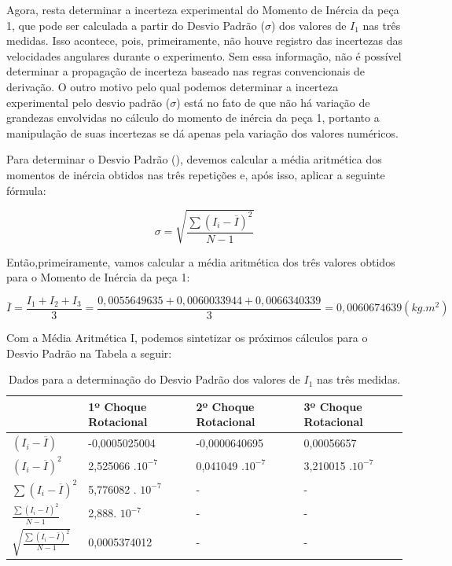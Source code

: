 Agora, resta determinar a incerteza experimental do Momento de Inércia da peça 1, que pode ser calculada a partir do Desvio Padrão ($\sigma$) dos valores de $I_1$ nas três medidas. Isso acontece, pois, primeiramente, não houve registro das incertezas das velocidades angulares durante o experimento. Sem essa informação, não é possível determinar a propagação de incerteza baseado nas regras convencionais de derivação. O outro motivo pelo qual podemos determinar a incerteza experimental pelo desvio padrão ($\sigma$) está no fato de que não há variação de grandezas envolvidas no cálculo do momento de inércia da peça 1, portanto a manipulação de suas incertezas se dá apenas pela variação dos valores numéricos.

Para determinar o Desvio Padrão (), devemos calcular a média aritmética dos momentos de inércia obtidos nas três repetições e, após isso, aplicar a seguinte fórmula:

\[\sigma = \sqrt{\frac {\sum(I_i - \overline{I})^2}{N-1}}\]

Então,primeiramente, vamos calcular a média aritmética dos três valores obtidos para o Momento de Inércia da peça 1:

\[\overline{I} = \frac{I_1 + I_2 + I_3}{3} = \frac{0,0055649635 + 0,0060033944 + 0,0066340339}{3} = 0,0060674639 (kg.m^2)\]

Com a Média Aritmética I, podemos sintetizar os próximos cálculos para o Desvio Padrão na Tabela a seguir:

\begin{table}[H]
    \centering
    \begin{tabular}{ |M{3cm}||M{3cm}||M{3cm}||M{3cm}|}
        \hline
        \textbf{ } & \textbf{1º Choque Rotacional} & \textbf{2º Choque Rotacional} & \textbf{3º Choque Rotacional}\\
        \hline
        $(I_i - \overline{I})$ & -0,0005025004 & -0,0000640695 & 0,00056657\\
        $(I_i - \overline{I})^2$ & 2,525066 .$10^{-7}$ & 0,041049 .$10^{-7}$ & 3,210015 .$10^{-7}$\\
        $\sum(I_i - \overline{I})^2$ & 5,776082 . $10^{-7}$  & - & -\\
        $\frac {\sum(I_i - \overline{I})^2}{N-1}$ & 2,888. $10^{-7}$ & - & -\\
        $\sqrt{\frac {\sum(I_i - \overline{I})^2}{N-1}}$ & 0,0005374012 & - & -\\
        \hline
    \end{tabular}
    \caption{Dados para a determinação do Desvio Padrão dos valores de $I_1$ nas três medidas.}
\end{table}

